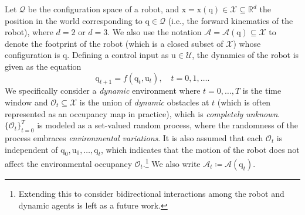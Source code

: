 \documentclass[lettersize,journal]{IEEEtran}
\begin{document}
Let $\mathcal{Q}$ be the configuration space of a robot, and  $\mathrm{x} = \mathrm{x}(\mathrm{q}) \in \mathcal{X} \subseteq \mathbb{R}^d$ the position in the world corresponding to $\mathrm{q}\in \mathcal{Q}$ (i.e., the forward kinematics of the robot), where $d = 2$ or $d=3$.
We also use the notation $\mathcal{A} = \mathcal{A}(\mathrm{q}) \subseteq \mathcal{X}$ to denote the footprint of the robot (which is a closed subset of $\mathcal{X}$) whose configuration is $\mathrm{q}$. Defining a control input as $\mathrm{u} \in \mathcal{U}$, the dynamics of the robot is given as the equation
\begin{equation*}
\mathrm{q}_{t+1} = f(\mathrm{q}_{t}, \mathrm{u}_{t}), \quad t = 0, 1, \ldots.
\end{equation*}
We specifically consider a \emph{dynamic} environment where $t =0, \ldots, T$ is the time window and $\mathcal{O}_t \subseteq \mathcal{X}$ is the union of \emph{dynamic} obstacles at $t$ (which is often represented as an occupancy map in practice), which is \emph{completely unknown}. $\{ \mathcal{O}_t\}_{t = 0}^T$ is modeled as a set-valued random process, where the randomness of the process embraces \emph{environmental variations}. It is also assumed that each $\mathcal{O}_t$ is independent of $\mathrm{q}_0, \mathrm{u}_0, \ldots, \mathrm{q}_t$, which indicates that the motion of the robot does not affect the environmental occupancy $\mathcal{O}_t$.\footnote{Extending this to consider bidirectional interactions among the robot and dynamic agents is left as a future work.} We also write $\mathcal{A}_t \coloneqq \mathcal{A}(\mathrm{q}_t)$.
\end{document}
